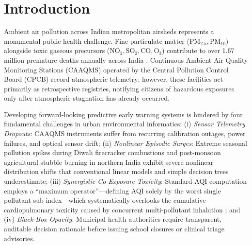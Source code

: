 \documentclass[conference]{IEEEtran}
\begin{document}
\section{Introduction}
Ambient air pollution across Indian metropolitan airsheds represents a monumental public health challenge. Fine particulate matter ($\text{PM}_{2.5}, \text{PM}_{10}$) alongside toxic gaseous precursors ($\text{NO}_2, \text{SO}_2, \text{CO}, \text{O}_3$) contribute to over 1.67 million premature deaths annually across India \cite{who2021, balakrishnan2019}. Continuous Ambient Air Quality Monitoring Stations (CAAQMS) operated by the Central Pollution Control Board (CPCB) record atmospheric telemetry; however, these facilities act primarily as retrospective registries, notifying citizens of hazardous exposures only after atmospheric stagnation has already occurred.

Developing forward-looking predictive early warning systems is hindered by four fundamental challenges in urban environmental informatics: (i) \textit{Sensor Telemetry Dropouts}: CAAQMS instruments suffer from recurring calibration outages, power failures, and optical sensor drift; (ii) \textit{Nonlinear Episodic Surges}: Extreme seasonal pollution spikes during Diwali firecracker combustions and post-monsoon agricultural stubble burning in northern India exhibit severe nonlinear distribution shifts that conventional linear models and simple decision trees underestimate; (iii) \textit{Synergistic Co-Exposure Toxicity}: Standard AQI computation employs a ``maximum operator''---defining AQI solely by the worst single pollutant sub-index---which systematically overlooks the cumulative cardiopulmonary toxicity caused by concurrent multi-pollutant inhalation \cite{kashyap2023}; and (iv) \textit{Black-Box Opacity}: Municipal health authorities require transparent, auditable decision rationale before issuing school closures or clinical triage advisories.
\end{document}
